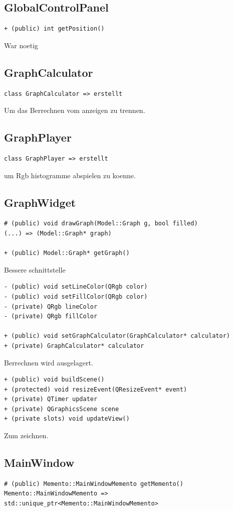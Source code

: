 \documentclass{scrartcl}
\begin{document}
{\subsection{GlobalControlPanel}
\begin{verbatim}
+ (public) int getPosition()
\end{verbatim}
War noetig
\subsection{GraphCalculator}
\begin{verbatim}
class GraphCalculator => erstellt
\end{verbatim}
Um das Berrechnen vom anzeigen zu trennen.
\subsection{GraphPlayer}
\begin{verbatim}
class GraphPlayer => erstellt
\end{verbatim}
um Rgb histogramme abspielen zu koenne.
\subsection{GraphWidget}
\begin{verbatim}
# (public) void drawGraph(Model::Graph g, bool filled)
(...) => (Model::Graph* graph)

+ (public) Model::Graph* getGraph()
\end{verbatim}
Bessere schnittstelle
\begin{verbatim}
- (public) void setLineColor(QRgb color)
- (public) void setFillColor(QRgb color)
- (private) QRgb lineColor
- (private) QRgb fillColor

+ (public) void setGraphCalculator(GraphCalculator* calculator)
+ (private) GraphCalculator* calculator
\end{verbatim}
Berrechnen wird ausgelagert.
\begin{verbatim}
+ (public) void buildScene()
+ (protected) void resizeEvent(QResizeEvent* event)
+ (private) QTimer updater
+ (private) QGraphicsScene scene
+ (private slots) void updateView()
\end{verbatim}
Zum zeichnen.
\subsection{MainWindow}
\begin{verbatim}
# (public) Memento::MainWindowMemento getMemento()
Memento::MainWindowMemento => std::unique_ptr<Memento::MainWindowMemento>


\end{verbatim}}
\end{document}

